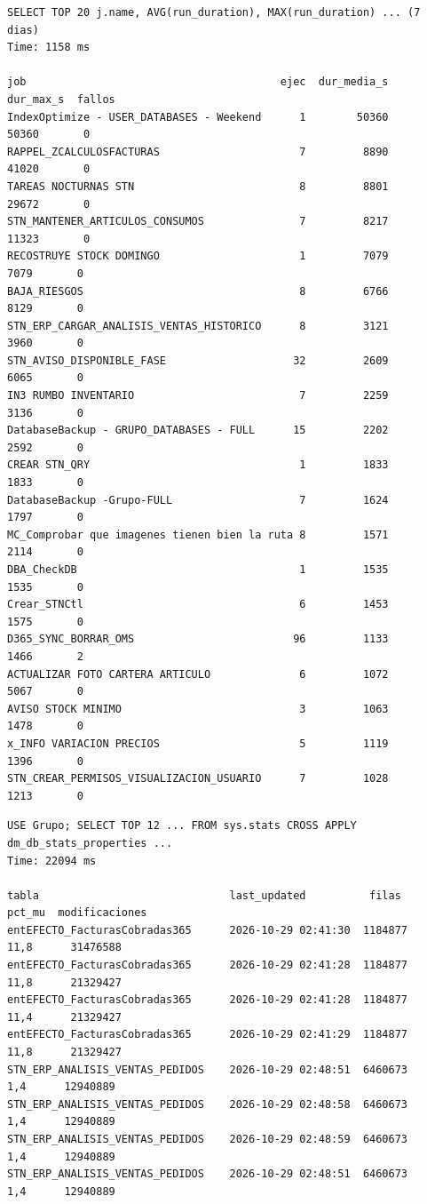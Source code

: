 \documentclass[11pt,a4paper]{article}
\begin{document}
\begin{lstlisting}[style=salida]
SELECT TOP 20 j.name, AVG(run_duration), MAX(run_duration) ... (7 dias)
Time: 1158 ms

job                                        ejec  dur_media_s  dur_max_s  fallos
IndexOptimize - USER_DATABASES - Weekend      1        50360      50360       0
RAPPEL_ZCALCULOSFACTURAS                      7         8890      41020       0
TAREAS NOCTURNAS STN                          8         8801      29672       0
STN_MANTENER_ARTICULOS_CONSUMOS               7         8217      11323       0
RECOSTRUYE STOCK DOMINGO                      1         7079       7079       0
BAJA_RIESGOS                                  8         6766       8129       0
STN_ERP_CARGAR_ANALISIS_VENTAS_HISTORICO      8         3121       3960       0
STN_AVISO_DISPONIBLE_FASE                    32         2609       6065       0
IN3 RUMBO INVENTARIO                          7         2259       3136       0
DatabaseBackup - GRUPO_DATABASES - FULL      15         2202       2592       0
CREAR STN_QRY                                 1         1833       1833       0
DatabaseBackup -Grupo-FULL                    7         1624       1797       0
MC_Comprobar que imagenes tienen bien la ruta 8         1571       2114       0
DBA_CheckDB                                   1         1535       1535       0
Crear_STNCtl                                  6         1453       1575       0
D365_SYNC_BORRAR_OMS                         96         1133       1466       2
ACTUALIZAR FOTO CARTERA ARTICULO              6         1072       5067       0
AVISO STOCK MINIMO                            3         1063       1478       0
x_INFO VARIACION PRECIOS                      5         1119       1396       0
STN_CREAR_PERMISOS_VISUALIZACION_USUARIO      7         1028       1213       0
\end{lstlisting}

\begin{lstlisting}[style=salida]
USE Grupo; SELECT TOP 12 ... FROM sys.stats CROSS APPLY dm_db_stats_properties ...
Time: 22094 ms

tabla                              last_updated          filas    pct_mu  modificaciones
entEFECTO_FacturasCobradas365      2026-10-29 02:41:30  1184877    11,8      31476588
entEFECTO_FacturasCobradas365      2026-10-29 02:41:28  1184877    11,8      21329427
entEFECTO_FacturasCobradas365      2026-10-29 02:41:28  1184877    11,4      21329427
entEFECTO_FacturasCobradas365      2026-10-29 02:41:29  1184877    11,8      21329427
STN_ERP_ANALISIS_VENTAS_PEDIDOS    2026-10-29 02:48:51  6460673     1,4      12940889
STN_ERP_ANALISIS_VENTAS_PEDIDOS    2026-10-29 02:48:58  6460673     1,4      12940889
STN_ERP_ANALISIS_VENTAS_PEDIDOS    2026-10-29 02:48:59  6460673     1,4      12940889
STN_ERP_ANALISIS_VENTAS_PEDIDOS    2026-10-29 02:48:51  6460673     1,4      12940889
\end{lstlisting}
\end{document}
